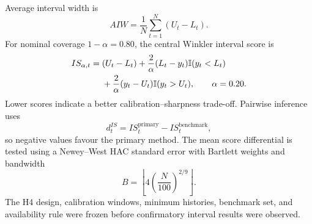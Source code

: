 Average interval width is
\begin{equation}
    AIW
    =
    \frac{1}{N}\sum_{t=1}^{N}(U_t-L_t).
    \label{eq:aiw}
\end{equation}
For nominal coverage \(1-\alpha=0.80\), the central Winkler interval score is
\begin{equation}
\begin{split}
    IS_{\alpha,t}
    ={}&(U_t-L_t)
    +\frac{2}{\alpha}(L_t-y_t)\mathbb{I}(y_t<L_t)\\
    &+\frac{2}{\alpha}(y_t-U_t)\mathbb{I}(y_t>U_t),
    \qquad \alpha=0.20.
\end{split}
\label{eq:interval_score}
\end{equation}
Lower scores indicate a better calibration--sharpness trade-off.  Pairwise
inference uses
\[
    d_t^{IS}
    =
    IS_t^{\mathrm{primary}}
    -
    IS_t^{\mathrm{benchmark}},
\]
so negative values favour the primary method.  The mean score differential
is tested using a Newey--West HAC standard error with Bartlett weights and
bandwidth
\begin{equation}
    B
    =
    \left\lfloor
        4\left(\frac{N}{100}\right)^{2/9}
    \right\rfloor.
    \label{eq:h4_hac_bandwidth}
\end{equation}
The H4 design, calibration windows, minimum histories, benchmark set, and
availability rule were frozen before confirmatory interval results were
observed.
